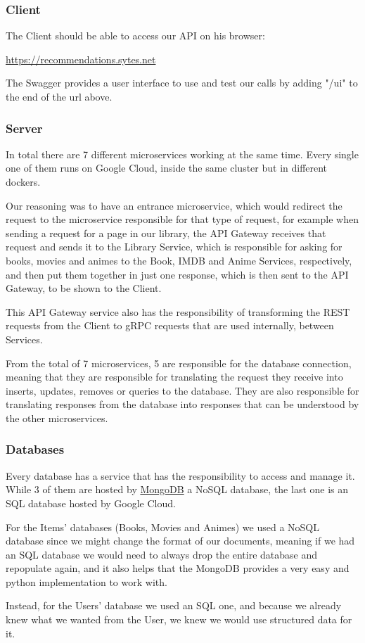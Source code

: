 \documentclass{article}
\newcommand*\fpar{\hspace{1ex}}
\begin{document}
    \subsubsection{Client}
    \fpar The Client should be able to access our API on his browser:
    \begin{center}
      \url{https://recommendations.sytes.net}
    \end{center}
    \par The Swagger provides a user interface to use and test our calls by adding "/ui" to the end of the url above.

    \subsubsection{Server}
    \fpar In total there are 7 different microservices working at the same time. Every single one of them runs on Google Cloud, inside the same cluster but in different dockers.
    \par Our reasoning was to have an entrance microservice, which would redirect the request to the microservice responsible for that type of request, for example when sending a request for a page in our library, the API Gateway receives that request and sends it to the Library Service, which is responsible for asking for books, movies and animes to the Book, IMDB and Anime Services, respectively, and then put them together in just one response, which is then sent to the API Gateway, to be shown to the Client.
    \par This API Gateway service also has the responsibility of transforming the REST requests from the Client to gRPC requests that are used internally, between Services.
    \par From the total of 7 microservices, 5 are responsible for the database connection, meaning that they are responsible for translating the request they receive into inserts, updates, removes or queries to the database. They are also responsible for translating responses from the database into responses that can be understood by the other microservices.

    \subsubsection{Databases}
    \fpar Every database has a service that has the responsibility to access and manage it. While 3 of them are hosted by \href{https://www.mongodb.com/}{MongoDB} a NoSQL database, the last one is an SQL database hosted by Google Cloud.
    \par For the Items' databases (Books, Movies and Animes) we used a NoSQL database since we might change the format of our documents, meaning if we had an SQL database we would need to always drop the entire database and repopulate again, and it also helps that the MongoDB provides a very easy and python implementation to work with.
    \par Instead, for the Users' database we used an SQL one, and because we already knew what we wanted from the User, we knew we would use structured data for it.
\end{document}
